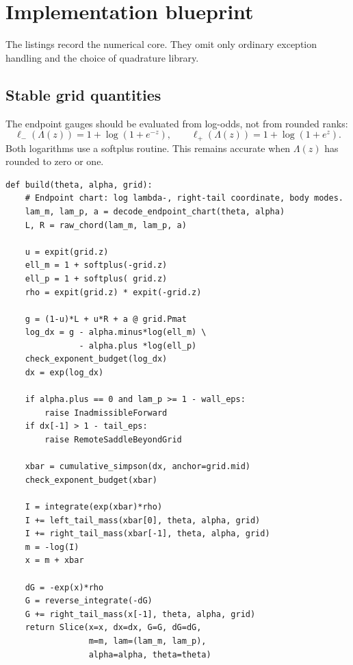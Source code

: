 \section{Implementation blueprint}
\label{app:implementation}

The listings record the numerical core.  They omit only ordinary exception
handling and the choice of quadrature library.

\subsection{Stable grid quantities}

The endpoint gauges should be evaluated from log-odds, not from rounded ranks:
\begin{equation}
\ell_-(\Lambda(z))=1+\log(1+e^{-z}),
\qquad
\ell_+(\Lambda(z))=1+\log(1+e^z).
\label{eq:stablegauges}
\end{equation}
Both logarithms use a softplus routine.  This remains accurate when
$\Lambda(z)$ has rounded to zero or one.

\begin{lstlisting}[caption={Build one generalized LQD slice.}]
def build(theta, alpha, grid):
    # Endpoint chart: log lambda-, right-tail coordinate, body modes.
    lam_m, lam_p, a = decode_endpoint_chart(theta, alpha)
    L, R = raw_chord(lam_m, lam_p, a)

    u = expit(grid.z)
    ell_m = 1 + softplus(-grid.z)
    ell_p = 1 + softplus( grid.z)
    rho = expit(grid.z) * expit(-grid.z)

    g = (1-u)*L + u*R + a @ grid.Pmat
    log_dx = g - alpha.minus*log(ell_m) \
               - alpha.plus *log(ell_p)
    check_exponent_budget(log_dx)
    dx = exp(log_dx)

    if alpha.plus == 0 and lam_p >= 1 - wall_eps:
        raise InadmissibleForward
    if dx[-1] > 1 - tail_eps:
        raise RemoteSaddleBeyondGrid

    xbar = cumulative_simpson(dx, anchor=grid.mid)
    check_exponent_budget(xbar)

    I = integrate(exp(xbar)*rho)
    I += left_tail_mass(xbar[0], theta, alpha, grid)
    I += right_tail_mass(xbar[-1], theta, alpha, grid)
    m = -log(I)
    x = m + xbar

    dG = -exp(x)*rho
    G = reverse_integrate(-dG)
    G += right_tail_mass(x[-1], theta, alpha, grid)
    return Slice(x=x, dx=dx, G=G, dG=dG,
                 m=m, lam=(lam_m, lam_p),
                 alpha=alpha, theta=theta)
\end{lstlisting}

